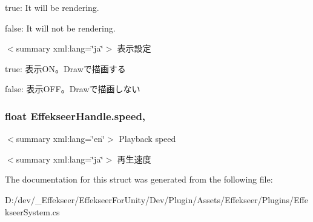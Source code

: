 true\-: It will be rendering.

false\-: It will not be rendering.

$<$summary xml\-:lang=\char`\"{}ja\char`\"{}$>$ 表示設定 

true\-: 表示\-O\-N。\-Drawで描画する

false\-: 表示\-O\-F\-F。\-Drawで描画しない\hypertarget{struct_effekseer_handle_a850710b2a953129286b171bb404fe674}{
\subsubsection[{speed}]{\setlength{\rightskip}{0pt plus 5cm}float Effekseer\-Handle.\-speed\hspace{0.3cm}{\ttfamily [get]}, {\ttfamily [set]}}}\label{struct_effekseer_handle_a850710b2a953129286b171bb404fe674}
$<$summary xml\-:lang=\char`\"{}en\char`\"{}$>$ Playback speed 

$<$summary xml\-:lang=\char`\"{}ja\char`\"{}$>$ 再生速度 

The documentation for this struct was generated from the following file\-:\begin{DoxyCompactItemize}
\item 
D\-:/dev/\-\_\-\-Effekseer/\-Effekseer\-For\-Unity/\-Dev/\-Plugin/\-Assets/\-Effekseer/\-Plugins/Effekseer\-System.\-cs\end{DoxyCompactItemize}
